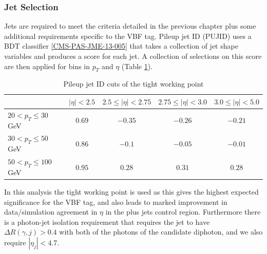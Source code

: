 \subsubsection{Jet Selection}
Jets are required to meet the criteria detailed in the previous chapter plus some additional requirements specific to the VBF tag.
Pileup jet ID (PUJID) uses a BDT classifier \ref{CMS-PAS-JME-13-005} that takes a collection of jet shape variables and produces a score for each jet. A collection of selections on this score are then applied for bins in $p_{T}$ and $\eta$ (Table \ref{tab:event_selection:tight_pujid}). 
\begin{table}[h!]
    \begin{tabular}{ l || c | c | c | c }
         & $|\eta| < 2.5$ & $2.5 \leq |\eta| < 2.75$ & $2.75 \leq |\eta| < 3.0$ & $3.0 \leq |\eta| < 5.0$ \\
        \hline
        \hline
        $20 < p_{T} \leq 30$\,GeV  & $0.69$ & $-0.35$ & $-0.26$ & $-0.21$ \\
        $30 < p_{T} \leq 50$\,GeV  & $0.86$ & $-0.1$  & $-0.05$ & $-0.01$ \\
        $50 < p_{T} \leq 100$\,GeV & $0.95$ & $0.28$  & $0.31$  & $0.28$  \\
\end{tabular}
    \caption{Pileup jet ID cuts of the tight working point}
    \label{tab:event_selection:tight_pujid}
\end{table}
In this analysis the tight working point is used as this gives the highest expected significance for the VBF tag, and also leads to marked improvement in data/simulation agreement in $\eta$ in the \Zee plus jets control region.  
Furthermore there is a photon-jet isolation requirement that requires the jet to have $\Delta{R}(\gamma,j) > 0.4$ with both of the photons of the candidate diphoton, and we also require $|\eta_{j}| < 4.7$.







